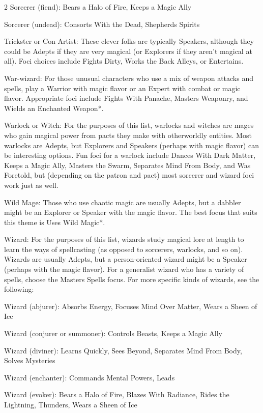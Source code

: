 \begin{multicols}{2}
Sorcerer (fiend): Bears a Halo of Fire, Keeps a Magic Ally 

Sorcerer (undead): Consorts With the Dead, Shepherds Spirits

Trickster or Con Artist: These clever folks are typically Speakers, although they could be Adepts if they are very magical (or Explorers if they aren’t magical at all). Foci choices include Fights Dirty, Works the Back Alleys, or Entertains. 

War-wizard: For those unusual characters who use a mix of weapon attacks and spells, play a Warrior with magic flavor or an Expert with combat or magic flavor. Appropriate foci include Fights With Panache, Masters Weaponry, and Wields an Enchanted Weapon*. 

Warlock or Witch: For the purposes of this list, warlocks and witches are mages who gain magical power from pacts they make with otherworldly entities. Most warlocks are Adepts, but Explorers and Speakers (perhaps with magic flavor) can be interesting options. Fun foci for a warlock include Dances With Dark Matter, Keeps a Magic Ally, Masters the Swarm, Separates Mind From Body, and Was Foretold, but (depending on the patron and pact) most sorcerer and wizard foci work just as well. 

Wild Mage: Those who use chaotic magic are usually Adepts, but a dabbler might be an Explorer or Speaker with the magic flavor. The best focus that suits this theme is Uses Wild Magic*.

Wizard: For the purposes of this list, wizards study magical lore at length to learn the ways of spellcasting (as opposed to sorcerers, warlocks, and so on). Wizards are usually Adepts, but a person-oriented wizard might be a Speaker (perhaps with the magic flavor). For a generalist wizard who has a variety of spells, choose the Masters Spells focus. For more specific kinds of wizards, see the following: 

Wizard (abjurer): Absorbs Energy, Focuses Mind Over Matter, Wears a Sheen of Ice 

Wizard (conjurer or summoner): Controls Beasts, Keeps a Magic Ally 

Wizard (diviner): Learns Quickly, Sees Beyond, Separates Mind From Body, Solves Mysteries 

Wizard (enchanter): Commands Mental Powers, Leads 

Wizard (evoker): Bears a Halo of Fire, Blazes With Radiance, Rides the Lightning, Thunders, Wears a Sheen of Ice 


\end{multicols}
